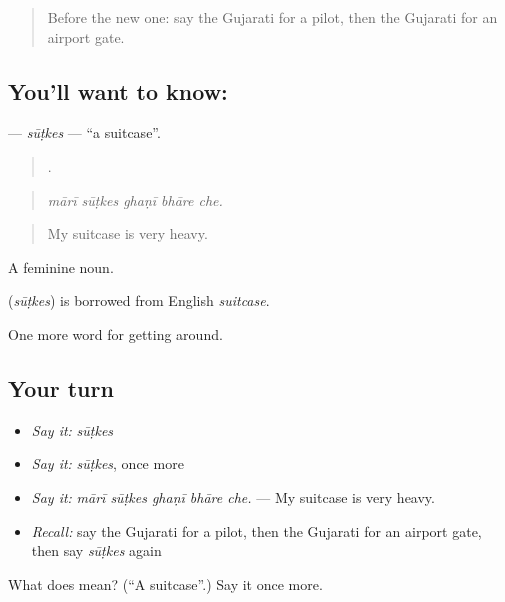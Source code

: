 \begin{quote}
Before the new one: say the Gujarati for a pilot, then the Gujarati for an airport gate.
\end{quote}

\subsection*{You'll want to know: }
\textbf{} — \emph{sūṭkes} — \textquotedblleft{}a suitcase\textquotedblright{}.

\begin{quote}
    .
\end{quote}

\begin{quote}
\emph{mārī sūṭkes ghaṇī bhāre che.}
\end{quote}

\begin{quote}
My suitcase is very heavy.
\end{quote}

A feminine noun.

\begin{cousinweb}
\textbf{} (\emph{sūṭkes}) is borrowed from English \emph{suitcase}.
\end{cousinweb}

\begin{grammarlens}[title={What you've built}]
One more word for getting around.
\end{grammarlens}

\subsection*{Your turn}
\begin{itemize}
\raggedright
  \item \emph{Say it:} \emph{sūṭkes}
  \item \emph{Say it:} \emph{sūṭkes}, once more
  \item \emph{Say it:} \emph{mārī sūṭkes ghaṇī bhāre che.} — My suitcase is very heavy.
  \item \emph{Recall:} say the Gujarati for a pilot, then the Gujarati for an airport gate, then say \emph{sūṭkes} again
\end{itemize}

\begin{tcolorbox}[breakable,colback=teal!4,colframe=teal!35!black,title={Before you move on}]
What does  mean? (\textquotedblleft{}A suitcase\textquotedblright{}.) Say it once more.
\end{tcolorbox}
